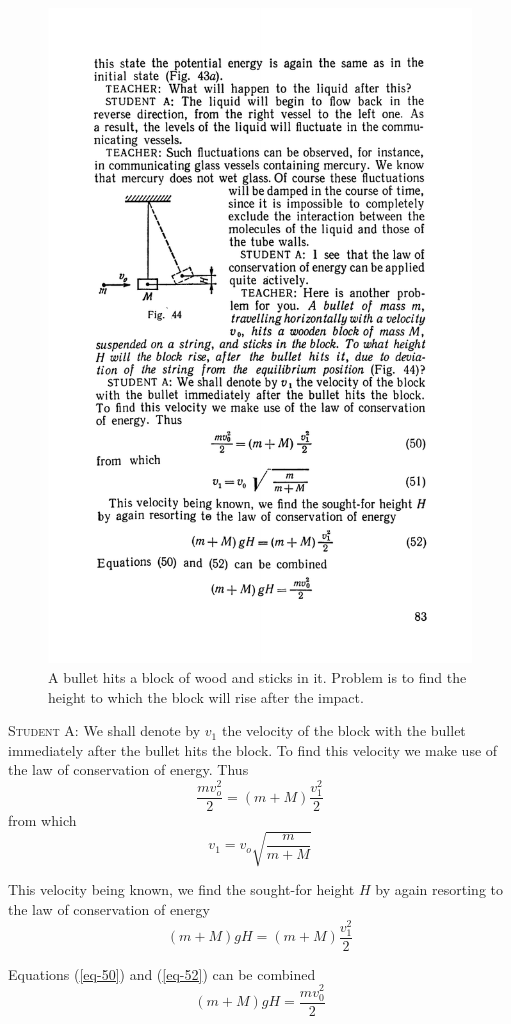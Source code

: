 \documentclass[a4paper,sfsidenotes]{tufte-book}
\begin{document}
\\
\begin{figure}
\centering
\includegraphics[width=0.4\linewidth]{fig-044a.pdf}
\caption{A bullet hits a block of wood and sticks in it. Problem is to find the height to which the block will rise after the impact.}
\label{fig-44}
\end{figure}

\textsc{Student A:} We shall denote by $v_{1}$ the velocity of the block with the bullet immediately after the bullet hits the block. To find this velocity we make use of the law of conservation of energy. Thus
\\
\begin{equation}
\frac{m v_{o}^{2}}{2} = \left( m + M \right) \frac{v_{1}^{2}}{2}
\label{eq-50}
\end{equation}
from which
\begin{equation}
v_{1} = v_{o} \sqrt{\frac{m}{ m + M}} 
\label{eq-51}
\end{equation}

This velocity being known, we find the sought-for height $H$ by again resorting to the law of conservation of energy
\\
\begin{equation}
(m+ M) gH = (m + M) 	\frac{v_{1}^{2}}{2}
\label{eq-52}
\end{equation}

Equations (\ref{eq-50}) and (\ref{eq-52}) can be combined
\\
\begin{equation*}
(m+ M) gH = \frac{mv_{0}^{2}}{2}
\end{equation*}
\end{document}
